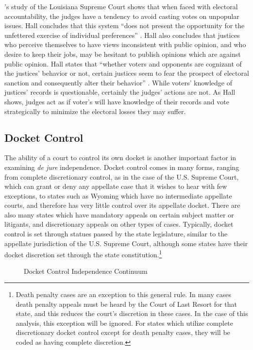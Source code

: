 \documentclass[12pt]{article}
\begin{document}
\citet{Hall1987a}'s study of the Louisiana Supreme Court shows that when faced with electoral accountability, the judges have a tendency to avoid casting votes on unpopular issues. Hall concludes that this system ``does not present the opportunity for the unfettered exercise of individual preferences'' \citep[46]{Hall1987a}.  Hall also concludes that justices who perceive themselves to have views inconsistent with public opinion,  and who desire to keep their jobs, may be hesitant to publish opinions which are against public opinion. Hall states that ``whether voters and opponents are cognizant of the justices’ behavior or not, certain justices seem to fear the prospect of electoral sanction and consequently alter their behavior'' \citep[1123]{Hall1987b}.  While voters’ knowledge of justices' records is questionable, certainly the judges' actions are not.  As Hall shows, judges act as if voter's will have knowledge of their records and vote strategically to minimize the electoral losses they may suffer.

\subsection*{Docket Control}
The ability of a court to control its own docket is another important factor in examining \textit{de jure} independence.  Docket control comes in many forms, ranging from complete discretionary control, as in the case of the U.S. Supreme Court, which can grant or deny any appellate case that it wishes to hear with few exceptions, to states such as Wyoming which have no intermediate appellate courts, and therefore has very little control over its appellate docket. There are also many states which have mandatory appeals on certain subject matter or litigants, and discretionary appeals on other types of cases.  Typically, docket control is set through statues passed by the state legislature, similar to the appellate jurisdiction of the U.S. Supreme Court, although some states have their docket discretion set through the state constitution.\footnote{Death penalty cases are an exception to this general rule.  In many cases death penalty appeals must be heard by the Court of Last Resort for that state, and this reduces the court's discretion in these cases.  In the case of this analysis, this exception will be ignored.  For states which utilize complete discretionary docket control except for death penalty cases, they will be coded as having complete discretion.}

\begin{figure}[tbh]\centering\caption{Docket Control Independence Continuum}\label{docketcontinuum}
\end{figure}
\end{document}
